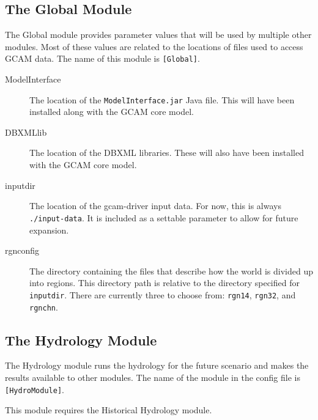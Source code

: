 \documentclass[11pt]{article}
\begin{document}
\subsection{The Global Module}
The Global module provides parameter values that will be used by multiple
other modules.  Most of these values are related to the locations of
files used to access GCAM data.  The name of this module is
\texttt{[Global]}.
\begin{description}
\item[ModelInterface] The location of the \texttt{ModelInterface.jar}
  Java file.  This will have been installed along with the GCAM core
  model.
\item[DBXMLlib] The location of the DBXML libraries.  These will also
  have been
  installed with the GCAM core model.
\item[inputdir] The location of the gcam-driver input data.  For now,
  this is always \texttt{./input-data}.  It is included as a settable
  parameter to allow for future expansion.
\item[rgnconfig] The directory containing the files that describe how
  the world is divided up into regions.  This directory path is
  relative to the directory specified for \texttt{inputdir}.  There
  are currently three to choose from:  \texttt{rgn14}, \texttt{rgn32},
  and \texttt{rgnchn}.
\end{description}


\subsection{The Hydrology Module}
The Hydrology module runs the hydrology for the future scenario and
makes the results available to other modules.  The name of the module
in the config file is \texttt{[HydroModule]}.

This module requires the Historical Hydrology module.
\end{document}
